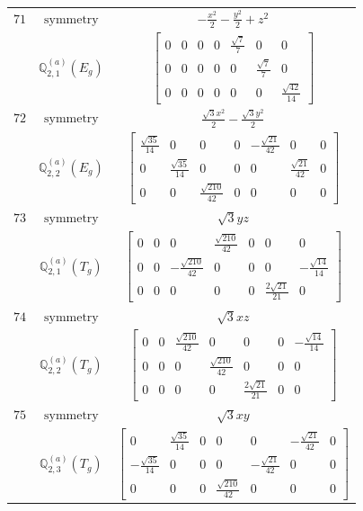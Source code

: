 \documentclass[fleqn,8pt,landscape]{jsarticle}
\begin{document}
\begin{longtable}{ccc}
$ 71 $ & $ \text{symmetry} $ & $ - \frac{x^{2}}{2} - \frac{y^{2}}{2} + z^{2} $ \\
$  $ & $ \mathbb{Q}_{2,1}^{(a)}(E_{g}) $ & $ \begin{bmatrix} 0 & 0 & 0 & 0 & \frac{\sqrt{7}}{7} & 0 & 0 \\ 0 & 0 & 0 & 0 & 0 & \frac{\sqrt{7}}{7} & 0 \\ 0 & 0 & 0 & 0 & 0 & 0 & \frac{\sqrt{42}}{14} \end{bmatrix} $ \\ \hline
$ 72 $ & $ \text{symmetry} $ & $ \frac{\sqrt{3} x^{2}}{2} - \frac{\sqrt{3} y^{2}}{2} $ \\
$  $ & $ \mathbb{Q}_{2,2}^{(a)}(E_{g}) $ & $ \begin{bmatrix} \frac{\sqrt{35}}{14} & 0 & 0 & 0 & - \frac{\sqrt{21}}{42} & 0 & 0 \\ 0 & \frac{\sqrt{35}}{14} & 0 & 0 & 0 & \frac{\sqrt{21}}{42} & 0 \\ 0 & 0 & \frac{\sqrt{210}}{42} & 0 & 0 & 0 & 0 \end{bmatrix} $ \\ \hline
$ 73 $ & $ \text{symmetry} $ & $ \sqrt{3} y z $ \\
$  $ & $ \mathbb{Q}_{2,1}^{(a)}(T_{g}) $ & $ \begin{bmatrix} 0 & 0 & 0 & \frac{\sqrt{210}}{42} & 0 & 0 & 0 \\ 0 & 0 & - \frac{\sqrt{210}}{42} & 0 & 0 & 0 & - \frac{\sqrt{14}}{14} \\ 0 & 0 & 0 & 0 & 0 & \frac{2 \sqrt{21}}{21} & 0 \end{bmatrix} $ \\ \hline
$ 74 $ & $ \text{symmetry} $ & $ \sqrt{3} x z $ \\
$  $ & $ \mathbb{Q}_{2,2}^{(a)}(T_{g}) $ & $ \begin{bmatrix} 0 & 0 & \frac{\sqrt{210}}{42} & 0 & 0 & 0 & - \frac{\sqrt{14}}{14} \\ 0 & 0 & 0 & \frac{\sqrt{210}}{42} & 0 & 0 & 0 \\ 0 & 0 & 0 & 0 & \frac{2 \sqrt{21}}{21} & 0 & 0 \end{bmatrix} $ \\ \hline
$ 75 $ & $ \text{symmetry} $ & $ \sqrt{3} x y $ \\
$  $ & $ \mathbb{Q}_{2,3}^{(a)}(T_{g}) $ & $ \begin{bmatrix} 0 & \frac{\sqrt{35}}{14} & 0 & 0 & 0 & - \frac{\sqrt{21}}{42} & 0 \\ - \frac{\sqrt{35}}{14} & 0 & 0 & 0 & - \frac{\sqrt{21}}{42} & 0 & 0 \\ 0 & 0 & 0 & \frac{\sqrt{210}}{42} & 0 & 0 & 0 \end{bmatrix} $ \\ \hline

\end{longtable}
\end{document}
